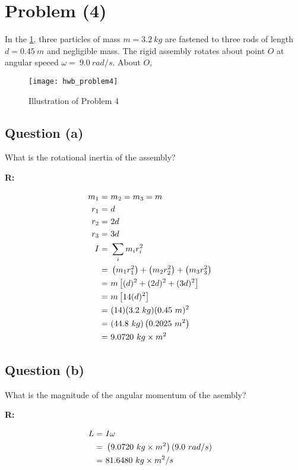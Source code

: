 \section{Problem (4)}
	In the \cref{fig:hwb_problem4}, three particles of mass $m = 3.2 \ kg$ are fastened to three rods of length $d = 0.45 \ m$ and negligible mass. The rigid assembly rotates about point $O$ at angular speeed $\omega = \ 9.0 \ rad/s$. About $O$,

	\begin{figure}[H]
		\begin{center}
			\texttt{[image: hwb\_problem4]}
			\caption{Illustration of Problem 4}
			\label{fig:hwb_problem4}
		\end{center}
	\end{figure}

	\subsection{Question (a)}

		What is the rotational inertia of the assembly?

		\textbf{R:}

		\begin{align}
			m_{1} = \ &m_{2} = m_{3} = m& \notag \\
			r_{1} = \ &d& \notag \\
			r_{2} = \ &2d& \notag \\
			r_{3} = \ &3d& \notag \\
			I = \ & \sum_{i} m_{i} r_{i}^{2}& \notag \\
			= \ & \left(m_{1}r_{1}^{2}\right) + \left(m_{2}r_{2}^{2}\right) + \left(m_{3}r_{3}^{2}\right)& \notag \\
			= \ & m\left[(d)^{2} + (2d)^{2} + (3d)^{2}\right]& \notag \\
			= \ & m\left[14(d)^{2}\right]& \notag \\
			= \ & (14)(3.2 \ kg)(0.45 \ m)^{2}& \notag \\
			= \ & (44.8 \ kg)\left(0.2025 \ m^{2}\right)& \notag \\
			= \ & 9.0720 \ kg \times m^{2}&
		\end{align}

	\subsection{Question (b)}

		What is the magnitude of the angular momentum of the asembly?

		\textbf{R:}

		\begin{align}
			L = \ &I \omega& \notag \\
			= \ &\left(9.0720 \ kg \times m^{2} \right) (9.0 \ rad/s)& \notag \\
			= \ &81.6480 \ kg \times m^{2}/s&
		\end{align}
